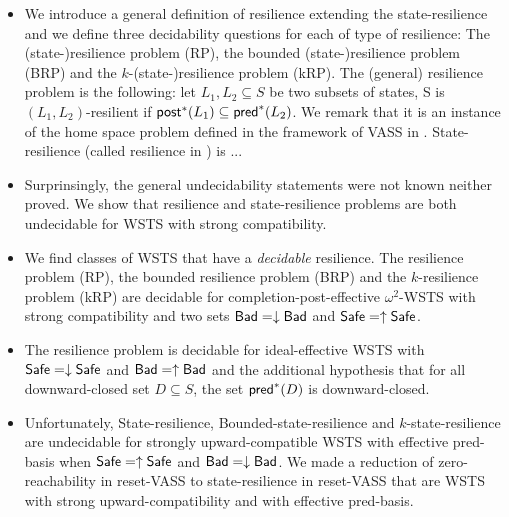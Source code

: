 \begin{itemize}

\item We introduce a general definition of resilience extending the state-resilience \cite{DBLP:journals/corr/PrasadZ16,DBLP:journals/corr/abs-2108-00889,DBLP:conf/gg/Ozkan22} and we define three decidability questions for each of type of resilience: The (state-)resilience problem (RP), the bounded (state-)resilience problem (BRP)
and the $k$-(state-)resilience problem (kRP). The (general) resilience problem is the following: let $L_1,L_2 \subseteq S$ be two subsets of states, S is $(L_1,L_2)$-resilient if $\textsf{post}^*(L_1)	\subseteq \textsf{pred}^*(L_2)$. We remark that it is an instance of the home space problem defined in the framework of VASS in \cite{DBLP:journals/corr/abs-2207-02697}.
State-resilience (called resilience in \cite{DBLP:journals/corr/PrasadZ16,DBLP:journals/corr/abs-2108-00889,DBLP:conf/gg/Ozkan22}) is ...

\item Surprinsingly, the general undecidability statements were not known neither proved. We show that resilience and state-resilience problems are both undecidable for WSTS with strong compatibility. 


\item We find classes of WSTS that have a \emph{decidable} resilience. The resilience problem (RP), the bounded resilience problem (BRP)
and the $k$-resilience problem (kRP) are decidable for completion-post-effective $\omega^2$-WSTS with strong compatibility and two sets $\textsf{Bad} = \downarrow \textsf{Bad}$ and $\textsf{Safe} = \uparrow \textsf{Safe}$.

\item The resilience problem is decidable for ideal-effective WSTS with 
$\textsf{Safe}=\downarrow \textsf{Safe}$
and $\textsf{Bad}=\uparrow \textsf{Bad}$
and
the additional hypothesis that
for all downward-closed set $D \subseteq S$, the set $\textsf{pred}^*(D)$ is downward-closed.

\item Unfortunately, {\sc State-resilience},
{\sc Bounded-state-resilience} and
{\sc $k$-state-resilience}
are undecidable for strongly upward-compatible WSTS with effective pred-basis
when
$\textsf{Safe}=\uparrow \textsf{Safe}$
and $\textsf{Bad}=\downarrow \textsf{Bad}$. We made a reduction of zero-reachability in reset-VASS to state-resilience in reset-VASS that are WSTS with strong upward-compatibility and with effective pred-basis.


\end{itemize}
